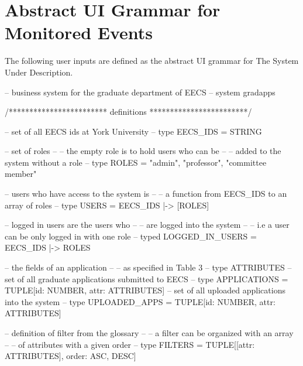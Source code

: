 \documentclass[fontsize=12pt,paper=letter,twoside]{scrartcl}
\begin{document}

\newpage
\section{Abstract UI Grammar for Monitored Events} \label{sec:ui_grammar}

The following user inputs are defined as the abstract UI grammar for The System Under Description.\\

\begin{code}
-- business system for the graduate department of EECS --
system gradapps

/************************ definitions ************************/

-- set of all EECS ids at York University --
type EECS_IDS = STRING

-- set of roles --
-- the empty role is to hold users who can be --
-- added to the system without a role --
type ROLES = {"admin", "professor", "committee member"}

-- users who have access to the system is --
-- a function from EECS_IDS to an array of roles --
type USERS = EECS_IDS |-> [ROLES]

-- logged in users are the users who --
-- are logged into the system --
-- i.e a user can be only logged in with one role --
typed LOGGED_IN_USERS = EECS_IDS |-> ROLES

-- the fields of an application -- 
-- as specified in Table 3 -- 
type ATTRIBUTES
-- set of all graduate applications submitted to EECS --
type APPLICATIONS = TUPLE[id: NUMBER, attr: ATTRIBUTES]
-- set of all uploaded applications into the system --
type UPLOADED_APPS = TUPLE[id: NUMBER, attr: ATTRIBUTES]

-- definition of filter from the glossary --
-- a filter can be organized with an array --
-- of attributes with a given order --
type FILTERS = TUPLE[[attr: ATTRIBUTES], order: {ASC, DESC}]
\end{code}
\end{document}
